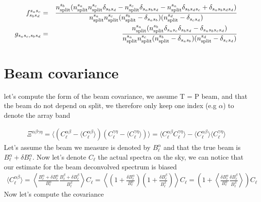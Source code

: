 \documentclass[a4paper, 11pt]{article}
\def\ba{\begin{eqnarray}}
\def\ea{\end{eqnarray}}
\begin{document}
\ba
 f_{s_{b} s_{d}}^{ s_{a} s_{c}} &=& \frac{n^{s_{b}}_{\rm split} (n^{s_{a}}_{\rm split} n^{s_{c}}_{\rm split} \delta_{s_{b}s_{d}} -   n^{s_{c}}_{\rm split} \delta_{s_{a}s_{b}s_{d}} -  n^{s_{a}}_{\rm split} \delta_{s_{b}s_{d}s_{c}}  +   \delta_{s_{a}s_{b}s_{d}s_{d}}) }{n^{s_{a}}_{\rm split} n^{s_{c}}_{\rm split}( n^{s_{b}}_{\rm split} -  \delta_{s_{a}s_{b}}) ( n^{s_{d}}_{\rm split} -  \delta_{s_{c}s_{d}})}  \nonumber \\
g_{s_{a} s_{c},  s_{b} s_{d}}  &=& \frac{n^{s_{a}}_{\rm split} (n^{s_{b}}_{\rm split}  \delta_{s_{a} s_{c}} \delta_{s_{b} s_{d}} - \delta_{s_{a} s_{b} s_{c} s_{d}})}{n^{s_{a}}_{\rm split} n^{s_{c}}_{\rm split}( n^{s_{b}}_{\rm split} -  \delta_{s_{a}s_{b}}) ( n^{s_{d}}_{\rm split} -  \delta_{s_{c}s_{d}})} 
 \ea 
 
 \section{Beam covariance}

let's compute the form of the beam covariance, we assume T = P beam, and that the beam do not depend on split, we therefore only keep one index (e.g $\alpha$) to denote the array band

\ba
\Xi^{ \alpha \beta \gamma \eta } = \langle ( C^{\alpha \beta}_{\ell} - \langle C^{\alpha \beta}_{\ell} \rangle) ( C^{\gamma \eta}_{\ell} - \langle C^{\gamma \eta}_{\ell} \rangle)   \rangle = \langle C^{\alpha \beta}_{\ell}C^{\gamma \eta}_{\ell}  \rangle -  \langle C^{\alpha \beta}_{\ell} \rangle  \langle C^{\gamma \eta}_{\ell} \rangle
\ea
Let's assume the beam we measure is denoted by $B^{\alpha}_{\ell}$ and that the true beam is $B^{\alpha}_{\ell} + \delta B^{\alpha}_{\ell}$.
Now let's denote $C_{\ell}$ the actual spectra on the sky,  we can notice that our estimate for the beam deconvolved spectrum is biased
\ba
\langle C^{\alpha \beta}_{\ell} \rangle   =  \left \langle \frac{B^{\alpha}_{\ell} + \delta B^{\alpha}_{\ell}}{B^{\alpha}_{\ell} } \frac{B^{\beta}_{\ell} + \delta B^{\beta}_{\ell}}{B^{\beta}_{\ell} } \right \rangle C_{\ell} = \left\langle \left(1 + \frac{\delta B^{\alpha}_{\ell}}{ B^{\alpha}_{\ell}} \right) \left(1 + \frac{\delta B^{\beta}_{\ell}}{ B^{\beta}_{\ell}} \right)  \right\rangle C_{\ell} = \left(1 + \left \langle \frac{\delta B^{\alpha}_{\ell}}{ B^{\alpha}_{\ell}}  \frac{\delta B^{\beta}_{\ell}}{ B^{\beta}_{\ell}} \right \rangle \right) C_{\ell} 
\ea
Now let's compute the covariance
\end{document}

